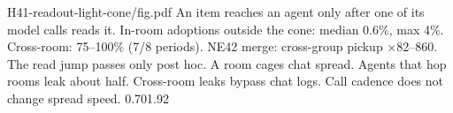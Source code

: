 {H41-readout-light-cone/fig.pdf}
{An item reaches an agent only after one of its model calls reads it.}
{In-room adoptions outside the cone: median 0.6\%, max 4\%. Cross-room: 75--100\% (7/8 periods). NE42 merge: cross-group pickup $\times$82--860. The read jump passes only post hoc.}
{A room cages chat spread. Agents that hop rooms leak about half. Cross-room leaks bypass chat logs. Call cadence does not change spread speed.}
{0.70}{1.92}
